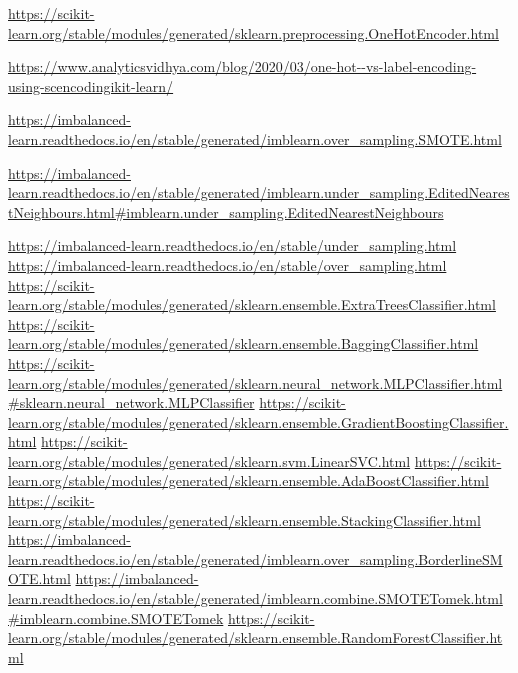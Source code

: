 \documentclass[a4paper,11pt]{article}
\begin{document}
  
\newpage
\begin{thebibliography}{9}
\url{https://scikit-learn.org/stable/modules/generated/sklearn.preprocessing.OneHotEncoder.html}

\url{https://www.analyticsvidhya.com/blog/2020/03/one-hot--vs-label-encoding-using-scencodingikit-learn/}

\url{https://imbalanced-learn.readthedocs.io/en/stable/generated/imblearn.over_sampling.SMOTE.html}

\url{https://imbalanced-learn.readthedocs.io/en/stable/generated/imblearn.under_sampling.EditedNearestNeighbours.html#imblearn.under_sampling.EditedNearestNeighbours}

\url{https://imbalanced-learn.readthedocs.io/en/stable/under_sampling.html}
\url{https://imbalanced-learn.readthedocs.io/en/stable/over_sampling.html}
\url{https://scikit-learn.org/stable/modules/generated/sklearn.ensemble.ExtraTreesClassifier.html}
\url{https://scikit-learn.org/stable/modules/generated/sklearn.ensemble.BaggingClassifier.html}
\url{https://scikit-learn.org/stable/modules/generated/sklearn.neural_network.MLPClassifier.html#sklearn.neural_network.MLPClassifier}
\url{https://scikit-learn.org/stable/modules/generated/sklearn.ensemble.GradientBoostingClassifier.html}
\url{https://scikit-learn.org/stable/modules/generated/sklearn.svm.LinearSVC.html}
\url{https://scikit-learn.org/stable/modules/generated/sklearn.ensemble.AdaBoostClassifier.html}
\url{https://scikit-learn.org/stable/modules/generated/sklearn.ensemble.StackingClassifier.html}
\url{https://imbalanced-learn.readthedocs.io/en/stable/generated/imblearn.over_sampling.BorderlineSMOTE.html}
\url{https://imbalanced-learn.readthedocs.io/en/stable/generated/imblearn.combine.SMOTETomek.html#imblearn.combine.SMOTETomek}
\url{https://scikit-learn.org/stable/modules/generated/sklearn.ensemble.RandomForestClassifier.html}

\end{thebibliography}
\end{document}
